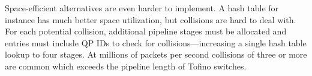 Space-efficient alternatives
are even harder to implement. A hash table for instance has much better space
utilization, but collisions are hard to deal with. For each
potential collision, additional pipeline stages must be allocated and entries
must include QP IDs to check for collisions---increasing a single hash table
lookup to four stages.
At millions of packets per second collisions of three or more are
common which exceeds the pipeline length of Tofino switches.







